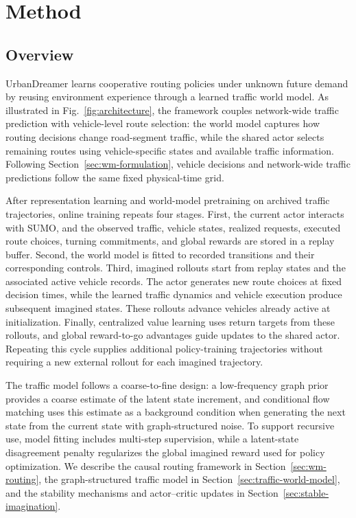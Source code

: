 \section{Method}
\label{sec:method}

\subsection{Overview}
\label{sec:overview}

UrbanDreamer learns cooperative routing policies under unknown future demand
by reusing environment experience through a learned traffic world model.
As illustrated in Fig.~\ref{fig:architecture}, the framework couples
network-wide traffic prediction with vehicle-level route selection:
the world model captures how routing decisions change road-segment traffic,
while the shared actor selects remaining routes using vehicle-specific states
and available traffic information. Following
Section~\ref{sec:wm-formulation}, vehicle decisions and network-wide traffic
predictions follow the same fixed physical-time grid.

After representation learning and world-model pretraining on archived
traffic trajectories, online training repeats four stages. First, the
current actor interacts with SUMO, and the observed traffic, vehicle states,
realized requests, executed route choices, turning commitments, and global
rewards are stored in a replay buffer. Second, the world model is fitted
to recorded transitions and their corresponding controls. Third, imagined
rollouts start from replay states and the associated active vehicle records.
The actor generates new route choices at fixed decision times, while the
learned traffic dynamics and vehicle execution produce subsequent imagined
states. These rollouts advance vehicles already active at initialization.
Finally, centralized value learning uses return targets from these
rollouts, and global reward-to-go advantages guide updates to the shared
actor. Repeating this cycle supplies additional policy-training
trajectories without requiring a new external rollout for each imagined
trajectory.

The traffic model follows a coarse-to-fine design: a low-frequency graph
prior provides a coarse estimate of the latent state increment, and
conditional flow matching uses this estimate as a background condition
when generating the next state from the current state with graph-structured
noise. To support recursive use, model fitting includes multi-step
supervision, while a latent-state disagreement penalty regularizes the
global imagined reward used for policy optimization. We describe the causal
routing framework in Section~\ref{sec:wm-routing}, the graph-structured
traffic model in Section~\ref{sec:traffic-world-model}, and the stability
mechanisms and actor--critic updates in
Section~\ref{sec:stable-imagination}.

